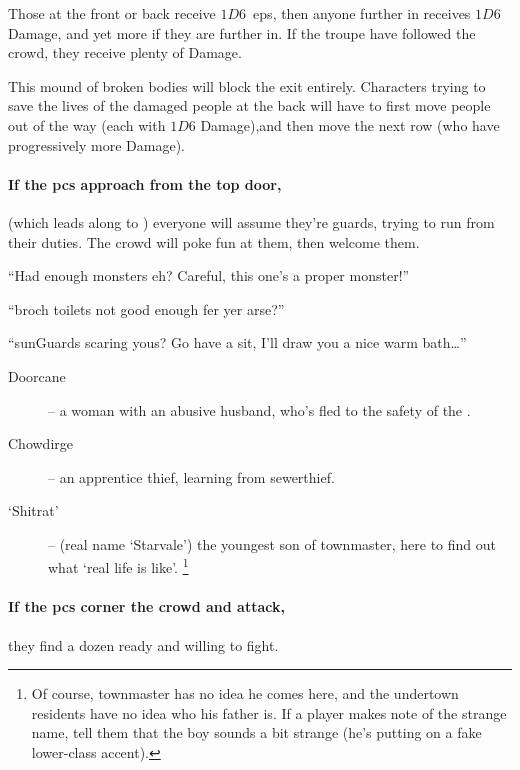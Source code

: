 \begin{multicols}{2}
Those at the front or back receive $1D6$~\glspl{ep}, then anyone further in receives $1D6$ Damage, and yet more if they are further in.
If the troupe have followed the crowd, they receive plenty of Damage.

This mound of broken bodies will block the exit entirely.
Characters trying to save the lives of the damaged people at the back will have to first move people out of the way (each with $1D6$ Damage),and then move the next row (who have progressively more Damage).

\paragraph{If the \glspl{pc} approach from the top door,}
(which leads along to ) everyone will assume they're \glspl{guard}, trying to run from their duties.
The crowd will poke fun at them, then welcome them.

\begin{speechtext}

  ``Had enough monsters eh?
  Careful, this one's a proper monster!''

  ``\Gls{broch} toilets not good enough fer yer arse?''

  ``\Glspl{sunGuard} scaring yous?
  Go have a sit, I'll draw you a nice warm bath\ldots''

\end{speechtext}

\begin{description}
  \item[Doorcane] -- a woman with an abusive husband, who's fled to the safety of the .
  \item[Chowdirge] -- an apprentice thief, learning from \gls{sewerthief}.
  \item[`Shitrat'] -- (real name `Starvale') the youngest son of \gls{townmaster}, here to find out what `real life is like'.%
  \footnote{Of course, \gls{townmaster} has no idea he comes here, and the undertown residents have no idea who his father is.  If a player makes note of the strange name, tell them that the boy sounds a bit strange (he's putting on a fake lower-class accent).}
\end{description}

\paragraph{If the \glspl{pc} corner the crowd and attack,}
they find a dozen ready and willing to fight.


\end{multicols}
